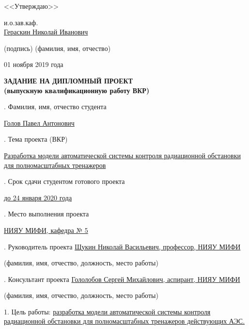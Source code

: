 \hspace{9.8cm}<<Утверждаю>>

\hspace{10cm} и.о.зав.каф.\\[0.1cm]

\hspace{7cm} \uline{\hspace{2.0cm}} \hspace{0.01cm} \uline{Гераскин Николай Иванович}

\hspace{7.5cm} \scriptsize (подпись) \hspace{2.0cm} (фамилия, имя, отчество)

\normalsize
\hspace{9cm} 01 ноября 2019 года\\[0.6cm]

\Large
\begin{center}
\textbf{ЗАДАНИЕ НА ДИПЛОМНЫЙ ПРОЕКТ\\
\normalsize
(выпускную квалификационную работу ВКР)} 
\end{center}

\normalsize
{}. Фамилия, имя, отчество студента

\noindent
\uline{Голов Павел Антонович}

. Тема проекта (ВКР)

\noindent
\uline{Разработка модели автоматической системы контроля радиационной обстановки для полномасштабных тренажеров}

. Срок сдачи студентом готового проекта

\noindent
\uline{до 24 января 2020 года}

. Место выполнения проекта

\noindent
\uline{НИЯУ МИФИ, кафедра № 5}

. Руководитель проекта \uline{Щукин Николай Васильевич, профессор, НИЯУ МИФИ}

\scriptsize \hspace{7cm} (фамилия, имя, отчество, должность, место работы)

\normalsize
{}. Консультант проекта \uline{Гололобов Сергей Михайлович, аспирант, НИЯУ МИФИ}

\scriptsize \hspace{7cm} (фамилия, имя, отчество, должность, место работы)

\clearpage

\normalsize
1. Цель работы: \ul{разработка модели автоматической системы контроля радиационной обстановки для полномасштабных 
тренажеров действующих АЭС.}

